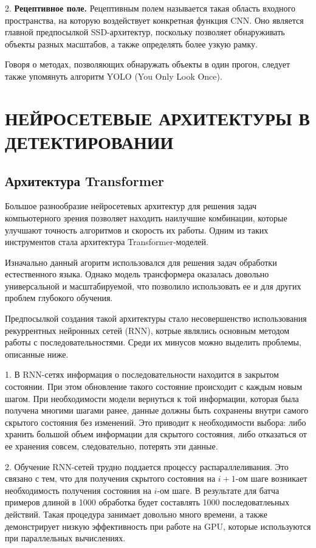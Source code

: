 \documentclass[14pt,a4paper]{extarticle}
\begin{document}
2. \textbf{Рецептивное поле.} Рецептивным полем называется такая область входного пространства, на которую воздействует конкретная функция CNN. Оно является главной предпосылкой SSD-архитектур, поскольку позволяет обнаруживать объекты разных масштабов, а также определять более узкую рамку. 

Говоря о методах, позволяющих обнаружать объекты в один прогон, следует также упомянуть алгоритм YOLO (You Only Look Once). 

\newpage
\section{НЕЙРОСЕТЕВЫЕ АРХИТЕКТУРЫ В ДЕТЕКТИРОВАНИИ}
\subsection{Архитектура Transformer}
Большое разнообразие нейросетевых архитектур для решения задач компьютерного зрения позволяет находить наилучшие комбинации, которые улучшают точность алгоритмов и скорость их работы. Одним из таких инструментов стала архитектура Transformer-моделей. 

Изначально данный агоритм использовался для решения задач обработки естественного языка. Однако модель трансформера оказалась довольно универсальной и масштабируемой, что позволило использовать ее и для других проблем глубокого обучения.

Предпосылкой создания такой архитектуры стало несовершенство использования рекуррентных нейронных сетей (RNN), котрые являлись основным методом работы с последовательностями. Среди их минусов можно выделить проблемы, описанные ниже.

1. В RNN-сетях информация о последовательности находится в закрытом состоянии. При этом обновление такого состояние происходит с каждым новым шагом. При необходимости модели вернуться к той информации, которая была получена многими шагами ранее, данные должны быть сохранены внутри самого скрытого состояния без изменений. Это приводит к необходимости выбора: либо хранить большой объем информации для скрытого состояния, либо отказаться от ее хранения совсем, следовательно, потерять эти данные.

2. Обучение RNN-сетей трудно поддается процессу распараллеливания. Это связано с тем, что для получения скрытого состояния на $i + 1$-ом шаге возникает необходимость получения состояния на $i$-ом шаге. В результате для батча примеров длиной в 1000 обработка будет составлять 1000 последоватлеьных действий. Такая процедура занимает довольно много времени, а также демонстрирует низкую эффективность при работе на GPU, которые используются при параллельных вычислениях. 
\end{document}
